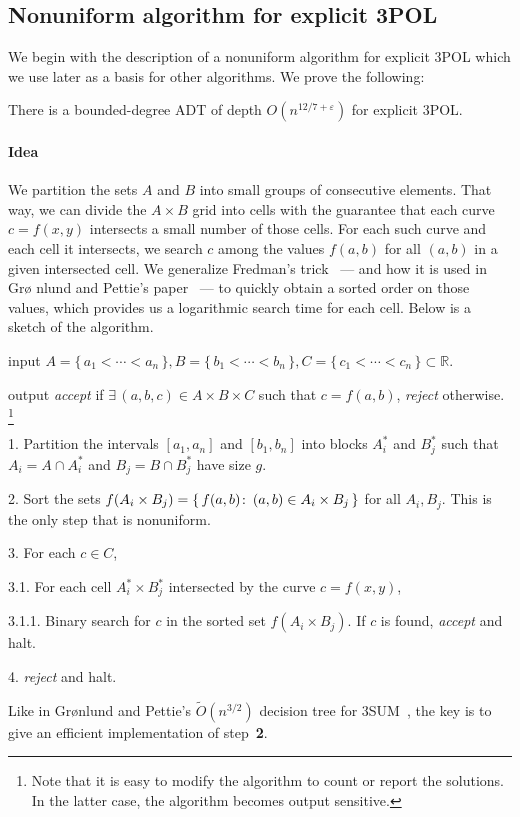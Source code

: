 \subsection{Nonuniform algorithm for explicit 3POL}%
\label{sec:algo:explicit:nonuniform}

We begin with the description of a nonuniform algorithm for explicit 3POL which
we use later as a basis for other algorithms. We prove the following:
\begin{theorem}\label{thm:explicit:act}
	There is a bounded-degree ADT of depth
	$O(n^{12/7+\varepsilon})$
	for explicit 3POL\@.
\end{theorem}

\paragraph{Idea}
We partition the sets $A$ and $B$ into small groups of consecutive
elements. That way, we can divide the $A\times B$ grid into cells with the
guarantee that each curve $c = f(x,y)$ intersects a small number
of those cells. For each such curve and each cell it intersects, we
search $c$ among the values $f(a,b)$ for all $(a,b)$ in a given intersected
cell. We generalize Fredman's trick~\cite{Fr76} --- and how it is used in Gr\o
nlund and Pettie's paper~\cite{GP18} --- to quickly obtain a sorted order on
those values, which provides us a logarithmic search time for each cell.
Below is a sketch of the algorithm.
\begin{algorithm}\label{algo:ne}
\item[input] $A = \{\,a_1 < \cdots < a_n\,\},B = \{\,b_1<\cdots<b_n\,\},
    C = \{\,c_1<\cdots<c_n\,\}
    \subset \mathbb{R}$.
\item[output] \emph{accept} if $\exists\, (a,b,c) \in A \times B \times C$ such that $c
    = f(a,b)$, \emph{reject} otherwise.%
    \footnote{Note that it is easy to modify the algorithm to count or report the
    solutions. In the latter case, the algorithm becomes output sensitive.}
\item[1.] Partition the intervals $[a_1,a_n]$ and $[b_1,b_n]$ into blocks
    $A_i^*$ and $B_j^*$ such that $A_i = A \cap A_i^*$ and $B_j = B
    \cap B_j^*$ have size $g$.
\item[2.] Sort the sets $f(A_i \times B_j) = \{\, f(a,b) \colon\, (a,b) \in A_i
    \times B_j\,\}$ for all $A_i,B_j$. This is the only step that
    is nonuniform.
\item[3.] For each $c \in C$,
\item[3.1.] For each cell $A_i^* \times B_j^*$ intersected by the curve
$c=f(x,y)$,
\item[3.1.1.] Binary search for $c$ in the sorted set $f(A_i \times B_j)$.
If $c$ is found, \emph{accept} and halt.
\item[4.] \emph{reject} and halt.
\end{algorithm}
%
Like in Gr\o nlund and Pettie's $\tilde{O}(n^{3/2})$ decision tree for
3SUM~\cite{GP18}, the key is to give an efficient implementation
of step~\textbf{2}.

